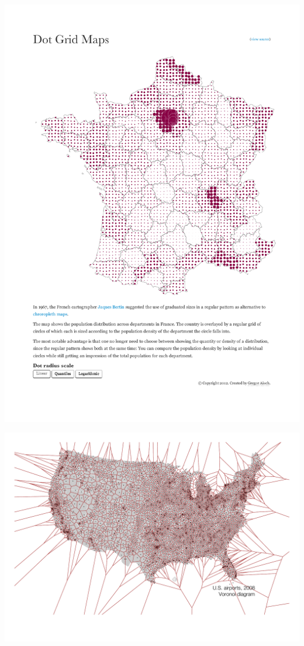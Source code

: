 \begin{itemize}
\parbox [h]{0.4\textwidth }{
    \includegraphics [width=\linewidth]{figures/map_types_dot_grid.pdf}
    \label{fig:map-type-dotgrid}
}
\hfill
\hspace{0.5cm}
\parbox [h]{0.4\textwidth }{
    \includegraphics [width=\linewidth]{figures/map_types_voronoi.pdf}
    \label{fig:map-type-voronoi}
}

\end{itemize}

